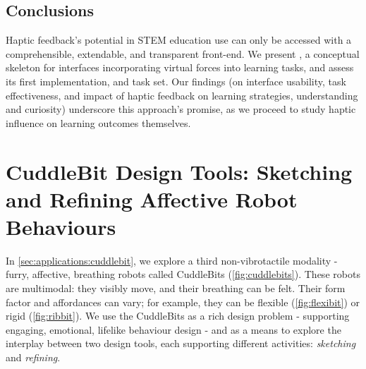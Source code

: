 









\subsection{Conclusions}
%

Haptic feedback's potential in STEM education use can only be accessed with a comprehensible, extendable, and transparent front-end. 
We present \HandsOn, a conceptual skeleton for interfaces incorporating virtual forces into learning tasks,
and assess its first implementation, \SpringSim and task set. 
Our findings (on interface usability, task effectiveness, and impact of haptic feedback on learning strategies, understanding and curiosity) underscore this approach's promise, as we proceed to study haptic influence on learning outcomes themselves.




\section{CuddleBit Design Tools: Sketching and Refining Affective Robot Behaviours}
\label{sec:applications:cuddlebit}
In \autoref{sec:applications:cuddlebit}, we explore a third non-vibrotactile modality - furry, affective, breathing robots called CuddleBits (\autoref{fig:cuddlebits}).
These robots are multimodal: they visibly move, and their breathing can be felt.
Their form factor and affordances can vary; for example, they can be flexible (\autoref{fig:flexibit}) or rigid (\autoref{fig:ribbit}).
We use the CuddleBits as a rich design problem - supporting engaging, emotional, lifelike behaviour design - and as a means to explore the interplay between two design tools, each supporting different activities: \emph{sketching} and \emph{refining}.

